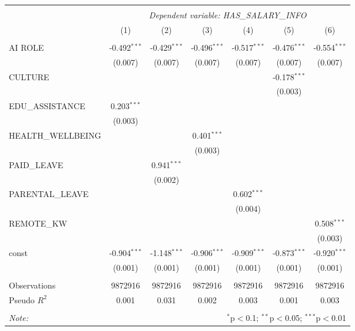 \begin{table}[!htbp] \centering
\begin{tabular}{@{\extracolsep{5pt}}lcccccc}
\\[-1.8ex]\hline
\hline \\[-1.8ex]
& \multicolumn{6}{c}{\textit{Dependent variable: HAS_SALARY_INFO}} \
\cr \cline{2-7}
\\[-1.8ex] & (1) & (2) & (3) & (4) & (5) & (6) \\
\hline \\[-1.8ex]
 AI ROLE & -0.492$^{***}$ & -0.429$^{***}$ & -0.496$^{***}$ & -0.517$^{***}$ & -0.476$^{***}$ & -0.554$^{***}$ \\
& (0.007) & (0.007) & (0.007) & (0.007) & (0.007) & (0.007) \\
 CULTURE & & & & & -0.178$^{***}$ & \\
& & & & & (0.003) & \\
 EDU_ASSISTANCE & 0.203$^{***}$ & & & & & \\
& (0.003) & & & & & \\
 HEALTH_WELLBEING & & & 0.401$^{***}$ & & & \\
& & & (0.003) & & & \\
 PAID_LEAVE & & 0.941$^{***}$ & & & & \\
& & (0.002) & & & & \\
 PARENTAL_LEAVE & & & & 0.602$^{***}$ & & \\
& & & & (0.004) & & \\
 REMOTE_KW & & & & & & 0.508$^{***}$ \\
& & & & & & (0.003) \\
 const & -0.904$^{***}$ & -1.148$^{***}$ & -0.906$^{***}$ & -0.909$^{***}$ & -0.873$^{***}$ & -0.920$^{***}$ \\
& (0.001) & (0.001) & (0.001) & (0.001) & (0.001) & (0.001) \\
\hline \\[-1.8ex]
 Observations & 9872916 & 9872916 & 9872916 & 9872916 & 9872916 & 9872916 \\
 Pseudo $R^2$ & 0.001 & 0.031 & 0.002 & 0.003 & 0.001 & 0.003 \\
\hline
\hline \\[-1.8ex]
\textit{Note:} & \multicolumn{6}{r}{$^{*}$p$<$0.1; $^{**}$p$<$0.05; $^{***}$p$<$0.01} \\
\end{tabular}
\end{table}